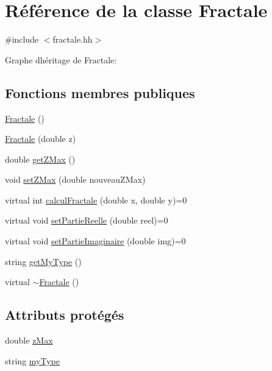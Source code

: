 \hypertarget{classFractale}{}\section{Référence de la classe Fractale}
\label{classFractale}


{\ttfamily \#include $<$fractale.\+hh$>$}



Graphe d\textquotesingle{}héritage de Fractale\+:
\subsection*{Fonctions membres publiques}
\begin{DoxyCompactItemize}
\item 
\hyperlink{classFractale_a0d3df9f1e22b8e83271406a5cf1d4f93}{Fractale} ()
\item 
\hyperlink{classFractale_a509d94d37fe5c6a8443b0eee6e516464}{Fractale} (double z)
\item 
double \hyperlink{classFractale_ac3c0405c60e5688e116d39f75289dcf4}{get\+Z\+Max} ()
\item 
void \hyperlink{classFractale_a2db0021af26f76cf1c8fcac92d5c107a}{set\+Z\+Max} (double nouveau\+Z\+Max)
\item 
virtual int \hyperlink{classFractale_a99a54c1b9b847ca24585f469cf03b67a}{calcul\+Fractale} (double x, double y)=0
\item 
virtual void \hyperlink{classFractale_a535969c022c88b7968784e160f41e1c3}{set\+Partie\+Reelle} (double reel)=0
\item 
virtual void \hyperlink{classFractale_ab2dc26f50f2b0a3cbe986986075fe8f5}{set\+Partie\+Imaginaire} (double img)=0
\item 
string \hyperlink{classFractale_aa7b38c97f45f50b5fbdde1188cf1978e}{get\+My\+Type} ()
\item 
virtual \hyperlink{classFractale_a36cd8c958e71902f7e20e9b2032dc089}{$\sim$\+Fractale} ()
\end{DoxyCompactItemize}
\subsection*{Attributs protégés}
\begin{DoxyCompactItemize}
\item 
double \hyperlink{classFractale_af7c03c738a3fb51e8e6bbc073bdbd3fe}{z\+Max}
\item 
string \hyperlink{classFractale_a6e1e6ca45cb1075c4602c99f2a855a93}{my\+Type}
\end{DoxyCompactItemize}


